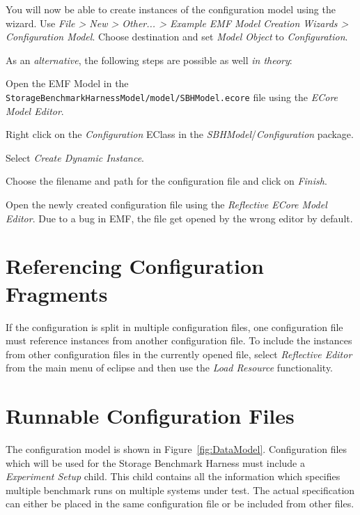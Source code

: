 You will now be able to create instances of the configuration model using the wizard. Use \emph{File > New > Other... > Example EMF Model Creation Wizards > Configuration Model}. Choose destination and set \emph{Model Object} to \emph{Configuration}.  

As an \emph{alternative}, the following steps are possible as well \emph{in theory}:
\begin{enumerate*}
    \item Open the EMF Model in the
        \texttt{Storage\-Benchmark\-Harness\-Model\-/model\-/SBHModel\-.ecore} file using
        the \textit{ECore Model Editor}.
    \item Right click on the \textit{Configuration} EClass in the
        \textit{SBHModel}/\textit{Configuration} package. 
    \item Select \textit{Create Dynamic Instance}.
    \item Choose the filename and path for the configuration file and click on
        \textit{Finish}. 
    \item Open the newly created configuration file using the \textit{Reflective
        ECore Model Editor}. Due to a bug in EMF, the file get opened by the
        wrong editor by default.
\end{enumerate*}

\section{Referencing Configuration Fragments}
If the configuration is split in multiple configuration files, one configuration
file must reference instances from another configuration file. To include the
instances from other configuration files in the currently opened file, select
\textit{Reflective Editor} from the main menu of eclipse and then use the
\textit{Load Resource} functionality.


\section{Runnable Configuration Files}
The configuration model is shown in Figure~\ref{fig:DataModel}. Configuration files which 
will be used for the Storage Benchmark Harness must
include a \textit{Experiment Setup} child. This child contains all the
information which specifies multiple benchmark runs on multiple systems under
test. The actual specification can either be placed in the same configuration
file or be included from other files.

